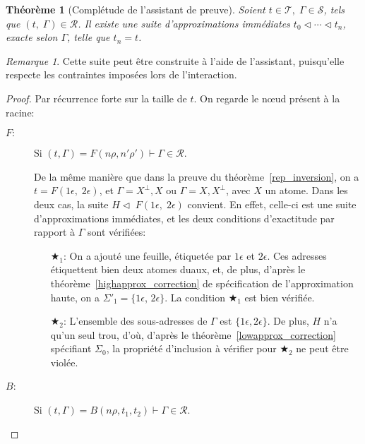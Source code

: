 \documentclass[11pt,a4paper]{article}
\theoremstyle{plain}
\newtheorem{theorem}{Théorème}
\theoremstyle{definition}
\theoremstyle{remark}
\newtheorem{remark}{Remarque}
\newcommand*{\orth}{^\perp}
\newcommand*{\sequent}{\Gamma}
\newcommand*{\sequents}{\ensuremath{\mathcal{S}}}
\newcommand*{\trees}{\ensuremath{\mathcal{T}}}
\newcommand*{\representations}{\ensuremath{\mathcal{R}}}
\newcommand*{\relapprox}{\ensuremath{\triangleleft}}
\newcommand*{\lowapprox}{\ensuremath{\Sigma_0}}
\newcommand*{\highapproxspec}{\ensuremath{\Sigma'_1}}
\newcommand*{\exactcond}{\bigstar_1}
\newcommand*{\exactcondbis}{\bigstar_2}
\begin{document}
\begin{theorem}[Complétude de l'assistant de preuve]
    \label{completeness}
    Soient $t \in \trees, \; \sequent \in \sequents$, tels que $(t, \; \sequent) \in \representations$.
    Il existe une suite d'approximations immédiates $t_0 \relapprox \cdots \relapprox t_n$, exacte selon $\sequent$, telle que $t_n = t$.
\end{theorem}

\begin{remark}
    Cette suite peut être construite à l'aide de l'assistant, puisqu'elle respecte les contraintes imposées lors de l'interaction.
\end{remark}

\begin{proof}
    Par récurrence forte sur la taille de $t$. On regarde le n\oe ud présent à la racine:
    \begin{description}
        \item[$F:$] 
            Si $(t, \sequent) = F(n\rho, n'\rho') \vdash \sequent \in \representations$.
        
            De la même manière que dans la preuve du théorème~\ref{rep_inversion}, on a $t = F(1 \epsilon, \; 2 \epsilon)$, et $\sequent = X\orth, X$ ou $\sequent = X, X\orth$, avec $X$ un atome. Dans les deux cas, la suite $H \relapprox \; F(1 \epsilon, \; 2 \epsilon)$ convient. En effet, celle-ci est une suite d'approximations immédiates, et les deux conditions d'exactitude par rapport à $\sequent$ sont vérifiées:
    
            \begin{enumerate}
                \item[$\exactcond$:] On a ajouté une feuille, étiquetée par $1 \epsilon$ et $2 \epsilon$. Ces adresses étiquettent bien deux atomes duaux, et, de plus, d'après le théorème~\ref{highapprox_correction} de spécification de l'approximation haute, on a $\highapproxspec = \{ 1 \epsilon$, $2 \epsilon\}$. La condition $\exactcond$ est bien vérifiée.
    
                \item[$\exactcondbis$:] L'ensemble des sous-adresses de $\sequent$ est $\{ 1 \epsilon, 2 \epsilon \}$. De plus, $H$ n'a qu'un seul trou, d'où, d'après le théorème~\ref{lowapprox_correction} spécifiant $\lowapprox$, la propriété d'inclusion à vérifier pour $\exactcondbis$ ne peut être violée.
            \end{enumerate}

        \item[$B$:] 
            Si $(t, \sequent) = B(n\rho, t_1, t_2) \vdash \sequent \in \representations$.


\end{description}
\end{proof}
\end{document}

